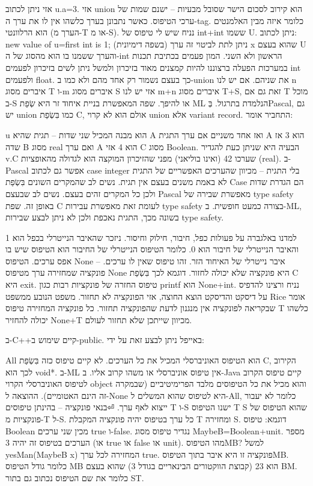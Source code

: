 \begin{טבלא}[!htbp]
      אזי ניתן לכתוב u.a=3. אזי union הוא קירוב לסכום הישר שסובל מבעיות – ישנם שמות של ערכי הטיפוס. כאשר נתבונן בערך כלשהו אין לו את ערך ה-tag. כלומר איזה מבין האלמנטים הוא הרלוונטי (הערך מ-T או מ-S).
      נניח שיש לי טיפוס של int+int ששמו U. ניתן לכתוב:
      new value of u=first int is 1; (בשפה דימיונית)
      ניתן לתת לביטוי זה ערך x שהוא בעצם U והערך ששמנו בו הוא מהסוג של ה-int הראשון ולא השני. המון פעמים בכתיבת תכנות במערכות הפעלה ברצוננו להיות קמצנים מאוד בזיכרון ולמשל ניתן לשים בזיכרון לפעמים int ולפעמים float. כך בעצם נשמור רק אחד מהם ולא כמו ב-union את שניהם.
      אם יש לנו n איברים מסוג T ו-m איברים מסוג S אזי יש לנו m+n איברים מסוג T+S, זאת גם אם T מוכל ב-S או להיפך. שפה המאפשרת בניית איחוד זר היא שְׂפַת ML הנלמדת בתרגול.
      בְּPascal, גם יש union כמו בִּשְׂפַת C, אולם הוא לא קרוי union אלא variant record. התחביר אומר:

      u הוא מבנה המכיל שני שדות – תגית שהיא A ואז אחד משניים אם ערך התגית A הוא 3 אז שדה B מסוג real ואם ערך A הוא 4 אזי C מסוג Boolean.
      הבעיה היא שניתן כעת להגדיר v.C שערכו 42 (ואינו בוליאני) מפני שהזיכרון המוקצה הוא לגדולה מהאופציות (real).
      ב-Pascal אפשר גם לכתוב case integer בלי התגית – מכיוון שהערכים האפשריים של התגית לא באמת משנים בעצם אין תגית. נשים לב שהמקרים השונים בִּשְׂפַת Case הם הגדרת שדות ולכן כל המקרים זהים בעצם. נשים לב שבעצם Pascal מאפשרת שבירה של type safety באופן זה.
      שפת C לעומת זאת מאפשרת עבירות type safety בצורה כמעט חופשית.
      ב-ML, בשונה מכך, התגית נאכפת ולכן לא ניתן לבצע שבירות type safety.

      למדנו באלגברה על פעולות כפל, חיבור, חילוק וחיסור. ניזכר שהאיבר הנייטרלי בכפל הוא 1 והאיבר הנייטרלי של חיבור הוא 0. כלומר הטיפוס הנייטרלי של החיבור הוא הטיפוס שיש בו אפס ערכים.
      הטיפוס None – איבר נייטרלי של האיחוד הזר. זהו טיפוס שאין לו ערכים. פונקציה שמחזירה ערך מטיפוס None היא פונקציה שלא יכולה לחזור. דוגמא לכך בִּשְׂפַת C היא exit.
      טיפוס החזרה של פונקציות רבות כגון printf הוא None+int. נניח ורצינו להדפיס על דיסקט והדיסקט הוצא החוצה, אזי הפונקציה לא תחזור.
      משפט הנובע ממשפט Rice אומר שבקריאה לפונקציה אין מנגנון לדעת שהפונקציה תחזור. כל פונקציה המחזירה טיפוס T כלשהו יכולה להחזיר None+T מכיוון שייתכן שלא תחזור לעולם.

      ב-C++קיים שימוש ב-public.
      באייפל ניתן לבצע זאת על ידי:

      All הוא הטיפוס האוניברסלי המכיל את כל הערכים. לא קיים טיפוס כזה בִּשְׂפַת C, הקירוב לכך הוא void*. ב-ML אין טיפוס אוניברסלי או משהו קרוב אליו. ב-Java קיים טיפוס הקרוב לטיפוס האוניברסלי הקרוי object והוא מכיל את כל הטיפוסים מלבד הפרימיטיביים (שבמקרה זה הינם האטומיים).
      ההוצאה ל-None היא לטיפוס שהוא המשלים ל-All, כלומר לא יעבור ייצוא לאף ערך.
⏎בנאי פונקציה – בהינתן טיפוסים T ו-S ישנו הטיפוס T S שהוא הטיפוס של פונקציות מ-T ל-S. כל ערך בטיפוס יהיה פונקציה המקבלת T ומחזירה S.
      דוגמא:
      טיפוס Boolean מכין שני ערכים true ו-false. נגדיר טיפוס מסוג
      MaybeB=Boolean+unit. מספר הערכים בטיפוס זה יהיה 3 (או true או false או unit).
      מהו הטיפוסMB?
      למשל yesMan(MaybeB x) המחזירה לכל ערך true. פונקציה זו היא איבר בתוך הטיפוסMB.
      כלומר גודל הטיפוס MB הוא 23 (קבוצת הווקטורים הבינאריים בגודל 3) שהוא בעצם BM.
      כלומר את שם הטיפוס נכתוב גם בתור ST.


\end{טבלא}
